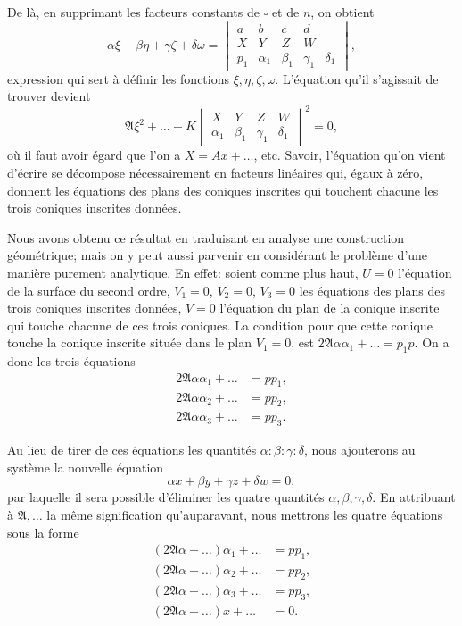 \documentclass[11pt,a4paper]{book}
\begin{document}
De l\`{a}, en supprimant les facteurs constants de $\square$ et de $n$, on obtient
\[
\alpha \xi + \beta \eta + \gamma \zeta + \delta \omega =
\begin{vmatrix}
a & b & c & d \\
X & Y & Z & W \\
p_1 & \alpha_1 & \beta_1 & \gamma_1 & \delta_1
\end{vmatrix},
\]
expression qui sert \`{a} d\'{e}finir les fonctions $\xi, \eta, \zeta, \omega$. L'\'{e}quation qu'il s'agissait de trouver devient
\[
\mathfrak{A}\xi^2 + \ldots - K
\begin{vmatrix}
X & Y & Z & W \\
\alpha_1 & \beta_1 & \gamma_1 & \delta_1
\end{vmatrix}^2 = 0,
\]
o\`{u} il faut avoir \'{e}gard que l'on a $X = Ax + \ldots$, etc. Savoir, l'\'{e}quation qu'on vient d'\'{e}crire se d\'{e}compose n\'{e}cessairement en facteurs lin\'{e}aires qui, \'{e}gaux \`{a} z\'{e}ro, donnent les \'{e}quations des plans des coniques inscrites qui touchent chacune les trois coniques inscrites donn\'{e}es.

Nous avons obtenu ce r\'{e}sultat en traduisant en analyse une construction g\'{e}om\'{e}trique; mais on y peut aussi parvenir en consid\'{e}rant le probl\`{e}me d'une mani\`{e}re purement analytique. En effet: soient comme plus haut, $U = 0$ l'\'{e}quation de la surface du second ordre, $V_1 = 0$, $V_2 = 0$, $V_3 = 0$ les \'{e}quations des plans des trois coniques inscrites donn\'{e}es, $V = 0$ l'\'{e}quation du plan de la conique inscrite qui touche chacune de ces trois coniques. La condition pour que cette conique touche la conique inscrite situ\'{e}e dans le plan $V_1 = 0$, est $2\mathfrak{A}\alpha\alpha_1 + \ldots = p_1 p$. On a donc les trois \'{e}quations
\begin{align*}
2\mathfrak{A}\alpha\alpha_1 + \ldots &= pp_1, \\
2\mathfrak{A}\alpha\alpha_2 + \ldots &= pp_2, \\
2\mathfrak{A}\alpha\alpha_3 + \ldots &= pp_3.
\end{align*}

Au lieu de tirer de ces \'{e}quations les quantit\'{e}s $\alpha : \beta : \gamma : \delta$, nous ajouterons au syst\`{e}me la nouvelle \'{e}quation
\[
\alpha x + \beta y + \gamma z + \delta w = 0,
\]
par laquelle il sera possible d'\'{e}liminer les quatre quantit\'{e}s $\alpha, \beta, \gamma, \delta$. En attribuant \`{a} $\mathfrak{A}, \ldots$ la m\^{e}me signification qu'auparavant, nous mettrons les quatre \'{e}quations sous la forme
\begin{align*}
(2\mathfrak{A}\alpha + \ldots)\alpha_1 + \ldots &= pp_1, \\
(2\mathfrak{A}\alpha + \ldots)\alpha_2 + \ldots &= pp_2, \\
(2\mathfrak{A}\alpha + \ldots)\alpha_3 + \ldots &= pp_3, \\
(2\mathfrak{A}\alpha + \ldots)x + \ldots &= 0.
\end{align*}
\end{document}
